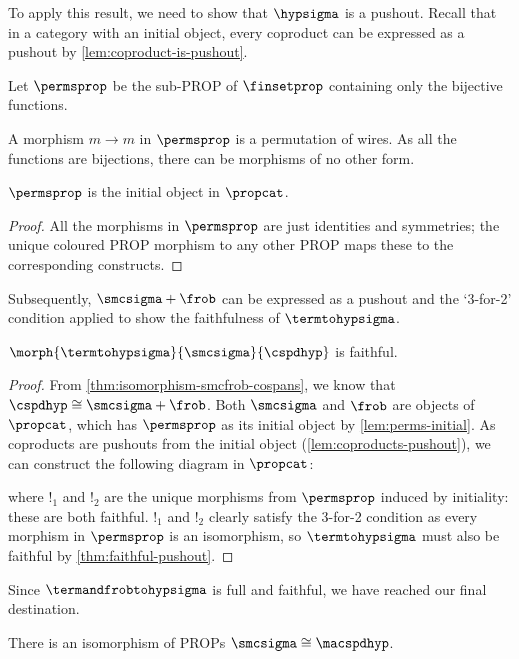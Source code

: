 To apply this result, we need to show that \(\hypsigma\) is a pushout.
Recall that in a category with an initial object, every coproduct can be
expressed as a pushout by \cref{lem:coproduct-is-pushout}.

\begin{definition}
    Let \(\permsprop\) be the sub-PROP of \(\finsetprop\)
    containing only the bijective functions.
\end{definition}

A morphism \(m \to m\) in \(\permsprop\) is a
permutation of wires.
As all the functions are bijections, there can be morphisms of no other form.

\begin{lemma}\label{lem:perms-initial}
    \(\permsprop\) is the initial object in \(\propcat\).
\end{lemma}
\begin{proof}
    All the morphisms in \(\permsprop\) are just
    identities and symmetries; the unique coloured PROP morphism to any other
    PROP maps these to the corresponding constructs.
\end{proof}

Subsequently, \(\smcsigma + \frob\) can be expressed as a pushout and the
`3-for-2' condition applied to show the faithfulness of \(\termtohypsigma\).

\begin{proposition}
    \(\morph{\termtohypsigma}{\smcsigma}{\cspdhyp}\) is faithful.
\end{proposition}
\begin{proof}
    From \cref{thm:isomorphism-smcfrob-cospans}, we know that
    \(\cspdhyp \cong \smcsigma + \frob\).
    Both \(\smcsigma\) and \(\frob\) are objects of \(\propcat\), which has
    \(\permsprop\) as its initial object by \cref{lem:perms-initial}.
    As coproducts are pushouts from the initial object
    (\cref{lem:coproducts-pushout}), we can construct the following diagram in
    \(\propcat\):
    \begin{center}
        
    \end{center}
    where \(!_1\) and \(!_2\) are the unique morphisms from
    \(\permsprop\) induced by initiality: these are both faithful.
    \(!_1\) and \(!_2\) clearly satisfy the 3-for-2 condition as every morphism
    in \(\permsprop\) is an isomorphism, so \(\termtohypsigma\) must also
    be faithful by \cref{thm:faithful-pushout}.
\end{proof}

Since \(\termandfrobtohypsigma\) is full and faithful, we have reached our
final destination.

\begin{corollary}
    There is an isomorphism of PROPs \(\smcsigma \cong \macspdhyp\).
\end{corollary}


